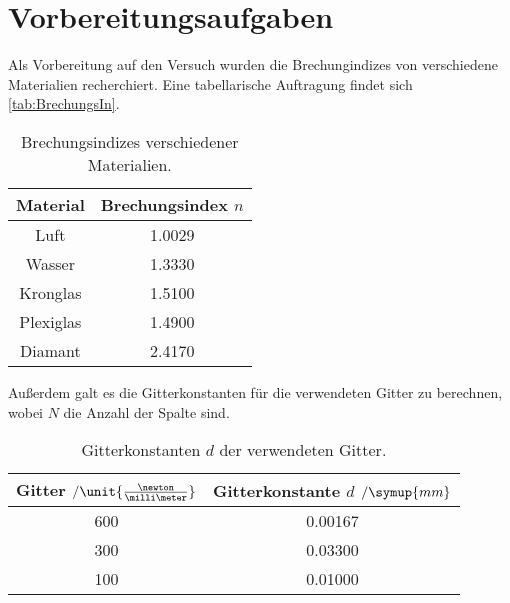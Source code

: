 \section{Vorbereitungsaufgaben}
\label{sec:Vorbereitung}
Als Vorbereitung auf den Versuch wurden die Brechungindizes von verschiedene Materialien recherchiert.
Eine tabellarische Auftragung findet sich \autoref{tab:BrechungsIn}.
\begin{table}
    \centering
    \caption{Brechungsindizes verschiedener Materialien.}
    \begin{tabular}{c c}
        \toprule
        Material & Brechungsindex $n$\\
        \midrule
        Luft & 1.0029\\
        Wasser & 1.3330\\
        Kronglas & 1.5100\\
        Plexiglas & 1.4900\\
        Diamant & 2.4170\\
        \bottomrule
    \end{tabular}
    \label{tab:BrechungsIn}
\end{table}
Außerdem galt es die Gitterkonstanten für die verwendeten Gitter zu berechnen, wobei $N$ die Anzahl der Spalte sind.
\begin{table}
    \centering
    \caption{Gitterkonstanten $d$ der verwendeten Gitter.}
    \begin{tabular}{c c}
        \toprule
        Gitter $\mathbin{/}\unit{\frac{\newton}{\milli \meter}}$& Gitterkonstante $d$ $\mathbin{/} \symup{mm}$\\
        \midrule
        600& 0.00167\\
        300 & 0.03300\\
        100 & 0.01000\\
        \bottomrule
    \end{tabular}
    \label{tab:BrechungsIn}
\end{table}